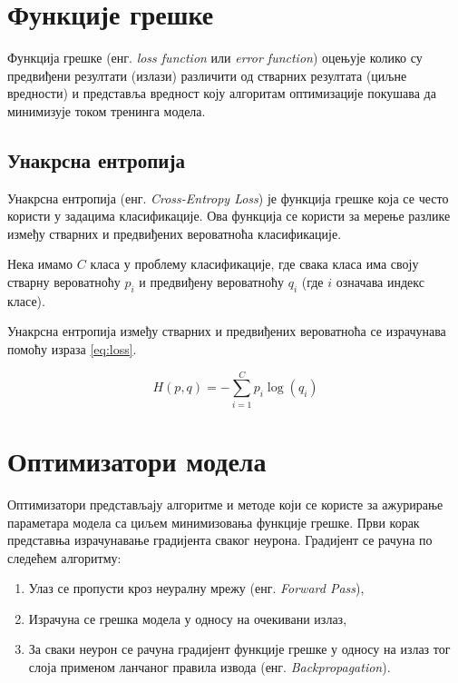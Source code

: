 \documentclass[a4paper, 12pt, master, utf8]{etf}
\begin{document}
\section{Функције грешке}
\label{sec:25}

Функција грешке (енг. \textit{loss function} или \textit{error function}) оцењује колико су предвиђени резултати (излази) различити од стварних резултата (циљне вредности) и представља вредност коју алгоритам 
оптимизације покушава да минимизује током тренинга модела.

\subsection{Унакрсна ентропија}
\label{sec:261}

Унакрсна ентропија (енг. \textit{Cross-Entropy Loss}) је функција грешке која се често користи у задацима класификације. 
Ова функција се користи за мерење разлике између стварних и предвиђених вероватноћа класификације.

Нека имамо $C$ класа у проблему класификације, где свака класа има своју стварну вероватноћу $p_i$ и предвиђену вероватноћу $q_i$ (где $i$ означава индекс класе).
\newline 

Унакрсна ентропија између стварних и предвиђених вероватноћа се израчунава помоћу израза \ref{eq:loss}.


\begin{equation}
    \label{eq:loss}
    H(p, q) = -\sum_{i=1}^{C} p_i \log(q_i)
\end{equation}
\section{Оптимизатори модела}
\label{sec:26}

Оптимизатори представљају алгоритме и методе који се користе за ажурирање параметара модела са циљем минимизовања функције грешке.
Први корак представња израчунавање градијента сваког неурона. Градијент се рачуна по следећем алгоритму:

\begin{enumerate}
    \item Улаз се пропусти кроз неуралну мрежу (енг. \textit{Forward Pass}),
    \item Израчуна се грешка модела у односу на очекивани излаз,
    \item За сваки неурон се рачуна градијент функције грешке у односу на излаз тог слоја применом ланчаног правила извода (енг. \textit{Backpropagation}).
\end{enumerate}
\end{document}
